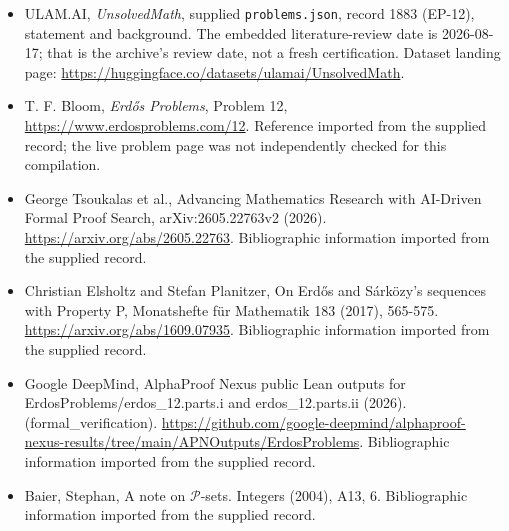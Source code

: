 \documentclass[11pt,a4paper]{article}
\begin{document}
{\small

\begin{itemize}

\item[\hypertarget{source:1883:1}{S1}] ULAM.AI, \emph{UnsolvedMath}, supplied \texttt{problems.json}, record 1883 (EP-12), statement and background. The embedded literature-review date is 2026-08-17; that is the archive’s review date, not a fresh certification. Dataset landing page: \url{https://huggingface.co/datasets/ulamai/UnsolvedMath}.

\item[\hypertarget{source:1883:2}{S2}] T. F. Bloom, \emph{Erdős Problems}, Problem 12, \url{https://www.erdosproblems.com/12}. Reference imported from the supplied record; the live problem page was not independently checked for this compilation.

\item[\hypertarget{source:1883:3}{S3}] George Tsoukalas et al., Advancing Mathematics Research with AI-Driven Formal Proof Search, arXiv:2605.22763v2 (2026). \url{https://arxiv.org/abs/2605.22763}. Bibliographic information imported from the supplied record.

\item[\hypertarget{source:1883:4}{S4}] Christian Elsholtz and Stefan Planitzer, On Erdős and Sárközy's sequences with Property P, Monatshefte für Mathematik 183 (2017), 565-575. \url{https://arxiv.org/abs/1609.07935}. Bibliographic information imported from the supplied record.

\item[\hypertarget{source:1883:5}{S5}] Google DeepMind, AlphaProof Nexus public Lean outputs for ErdosProblems/erdos\_12.parts.i and erdos\_12.parts.ii (2026). (formal\_verification). \url{https://github.com/google-deepmind/alphaproof-nexus-results/tree/main/APNOutputs/ErdosProblems}. Bibliographic information imported from the supplied record.

\item[\hypertarget{source:1883:6}{S6}] Baier, Stephan, A note on {$\mathcal P$}-sets. Integers (2004), A13, 6. Bibliographic information imported from the supplied record.

\end{itemize}

}

\label{end:1883}
\end{document}
